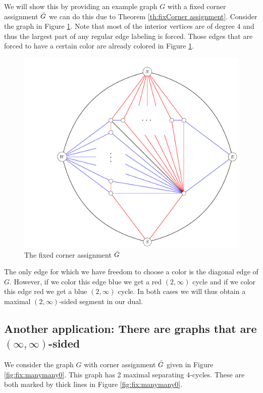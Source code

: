   We will show this by providing an example graph $G$ with a fixed corner assignment $\bar{G}$ we can do this due to Theorem \ref{th:fixCorner assignment}. Consider the graph in Figure \ref{fig:2manysidedLowerBound}. Note that most of the interior vertices are of degree $4$ and thus the largest part of any regular edge labeling is forced. Those edges that are forced to have a certain color are already colored in Figure \ref{fig:2manysidedLowerBound}.


  \begin{figure}[h!]
  \centering
  \includegraphics[scale=.5]{fixExtension/img/2manysidedLowerBound}

  \caption{The fixed corner assignment $\bar{G}$
      \label{fig:2manysidedLowerBound}}
  \end{figure}

  The only edge for which we have freedom to choose a color is the diagonal edge of $G$. However, if we color this edge blue we get a red $(2, \infty)$ cycle and if we color this edge red we get a blue $(2, \infty)$ cycle. In both cases we will thus obtain a maximal $(2,\infty)$-sided segment in our dual.

\subsection{Another application: There are graphs that are $(\infty, \infty)$-sided}
  \label{ss:fix:manymany}
  We consider the graph $G$ with corner assignment $\bar{G}$ given in Figure \ref{fig:fix:manymany0}. This graph has 2 maximal separating $4$-cycles. These are both marked by thick lines in Figure \ref{fig:fix:manymany0}.

